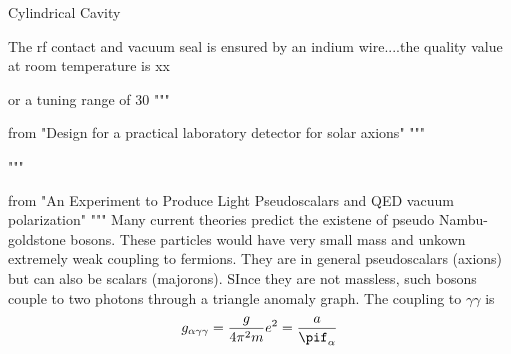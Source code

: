 \documentclass[12pt, twoside]{book}
\begin{document}
Cylindrical Cavity

The rf contact and vacuum seal is ensured by an indium wire....the quality value at room temperature is xx%

or a tuning range of 30%
"""

from "Design for a practical laboratory detector for solar axions"
"""

"""

from "An Experiment to Produce Light Pseudoscalars and QED vacuum polarization"
"""
Many current theories predict the existene of pseudo Nambu-goldstone bosons. These particles would have very small mass and unkown extremely weak coupling to fermions. They are in general pseudoscalars (axions) but can also be scalars (majorons). SInce they are not massless, such bosons couple to two photons through a triangle anomaly graph. The coupling to $\gamma\gamma$ is
\[

g_{\alpha\gamma\gamma} = \frac{g}{4\pi^2 m}e^2 = \frac{a}{\pif_\alpha}

\]
\end{document}
